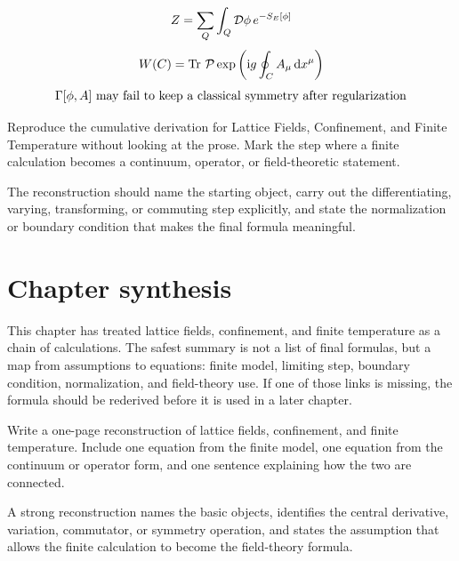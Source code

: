 \[
  Z=\sum_Q\int_Q\mathcal D\phi\,e^{-S_E[\phi]}
\]
\[
  W(C)=\operatorname{Tr}\,\mathcal P\exp\left(\mathrm i g\oint_C A_\mu\,\mathrm d x^\mu\right)
\]
\[
  \Gamma[\phi,A]\hbox{ may fail to keep a classical symmetry after regularization}
\]

\begin{exercise}
Reproduce the cumulative derivation for Lattice Fields, Confinement, and Finite Temperature without looking at the prose.  Mark the step where a finite calculation becomes a continuum, operator, or field-theoretic statement.
\begin{answer}
The reconstruction should name the starting object, carry out the differentiating, varying, transforming, or commuting step explicitly, and state the normalization or boundary condition that makes the final formula meaningful.
\end{answer}
\end{exercise}



\section{Chapter synthesis}

This chapter has treated lattice fields, confinement, and finite temperature as a chain of calculations.  The safest summary is not a list of final formulas, but a map from assumptions to equations: finite model, limiting step, boundary condition, normalization, and field-theory use.  If one of those links is missing, the formula should be rederived before it is used in a later chapter.

\begin{exercise}
Write a one-page reconstruction of lattice fields, confinement, and finite temperature.  Include one equation from the finite model, one equation from the continuum or operator form, and one sentence explaining how the two are connected.
\begin{answer}
A strong reconstruction names the basic objects, identifies the central derivative, variation, commutator, or symmetry operation, and states the assumption that allows the finite calculation to become the field-theory formula.
\end{answer}
\end{exercise}
